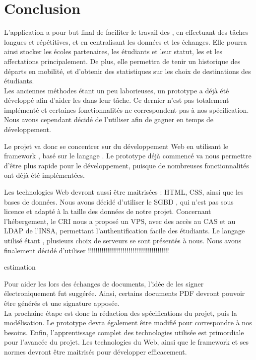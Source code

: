 
	\chapter*{Conclusion}

L'application a pour but final de faciliter le travail des \ris, en effectuant des tâches longues et répétitives, et en centralisant les données et les échanges. Elle pourra ainsi stocker les écoles partenaires, les étudiants et leur statut, les \voe et les affectations principalement. De plus, elle permettra de tenir un historique des départs en mobilité, et d'obtenir des statistiques sur les choix de destinations des étudiants. \\

Les anciennes méthodes étant un peu laborieuses, un prototype a déjà été développé afin d'aider les \ris dans leur tâche. Ce dernier n'est pas totalement implémenté et certaines fonctionnalités ne correspondent pas à nos spécification. Nous avons cependant décidé de l'utiliser afin de gagner en temps de développement.

Le projet va donc se concentrer sur du développement Web en utilisant le framework \symfony, basé sur le langage \php.
Le prototype déjà commencé va nous permettre d'être plus rapide pour le développement, puisque de nombreuses fonctionnalités ont déjà été implémentées. 

Les technologies Web devront aussi être maitrisées : HTML, CSS, ainsi que les bases de données. Nous avons décidé d'utiliser le SGBD \mdb, qui n'est pas sous licence et adapté à la taille des données de notre projet. Concernant l'hébergement, le CRI nous a proposé un VPS, avec des accès au CAS et au LDAP de l'INSA, permettant l'authentification facile des étudiants. Le langage utilisé étant \php, plusieurs choix de serveurs se sont présentés à nous. Nous avons finalement décidé d'utiliser !!!!!!!!!!!!!!!!!!!!!!!!!!!!!!!!!!!!!!!!!!

estimation


Pour aider les \ris lors des échanges de documents, l'idée de les signer électroniquement fut suggérée. Ainsi, certains documents PDF devront pouvoir être générés et une signature apposée. \\

La prochaine étape est donc la rédaction des spécifications du projet, puis la modélisation. Le prototype devra également être modifié pour correspondre à nos besoins. Enfin, l'apprentissage complet des technologies utilisée est primordiale pour l'avancée du projet. Les technologies du Web, ainsi que le framework \symfony et ses normes devront être maitrisés pour développer efficacement.